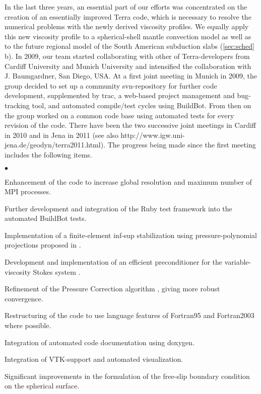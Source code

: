 \documentclass[twoside,10pt]{article}
\newenvironment{dlist}
   {\begin{list}
      {$\bullet$}
      {
      \setlength{\topsep}{0.5ex}
      \setlength{\partopsep}{0.0ex}
      \setlength{\parsep}{0.5ex}
      \setlength{\itemsep}{0.0ex}
      \setlength{\itemindent}{3.0ex}
      \setlength{\leftmargin}{0.0ex}
      \setlength{\labelsep}{1.0ex}
      }
   }
   {\end{list}}
\begin{document}
In the last three years, an essential part of our efforts was concentrated on the creation of an essentially improved Terra code, which is necessary to resolve the numerical problems with the newly derived viscosity profiles.
We equally apply this new viscosity profile to a spherical-shell mantle convection model \cite{Walzer2012,Walzer2012b} as well as to the future regional model of the South American subduction slabs (\ref{sec:sched} b).
In 2009, our team started collaborating with other of Terra-developers from Cardiff University and Munich University and intensified the collaboration with J. Baumgardner, San Diego, USA. 
At a first joint meeting in Munich in 2009, the group decided to set up a community svn-repository for further code development, supplemented by trac, a web-based project management and bug-tracking tool, and automated compile/test cycles using BuildBot. 
From then on the group worked on a common code base using automated tests for every revision of the code.
There have been the two successive joint meetings in Cardiff in 2010 and in Jena in 2011 (see also http://www.igw.uni-jena.de/geodyn/terra2011.html).
The progress being made since the first meeting includes the following items. 
\begin{dlist}
  \item Enhancement of the code to increase global resolution and maximum number of MPI processes.
  \item Further development and integration of the Ruby test framework \cite{Mueller2008} into the automated BuildBot tests.
  \item Implementation of a finite-element inf-sup stabilization using pressure-polynomial projections proposed in \cite{Dohrmann2004}.
  \item Development and implementation of an efficient preconditioner for the variable-viscosity Stokes system \cite{Koestler2011}.
  \item Refinement of the Pressure Correction algorithm \cite{Koestler2011}, giving more robust convergence.
  \item Restructuring of the code to use language features of Fortran95 and Fortran2003 where possible.
  \item Integration of automated code documentation using doxygen.
  \item Integration of VTK-support and automated visualization.
  \item Significant improvements in the formulation of the free-slip boundary condition on the spherical surface.
\end{dlist}
\end{document}
